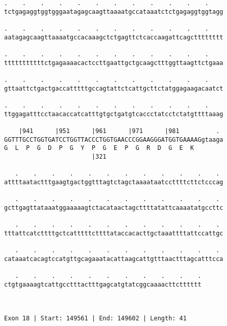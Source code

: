 \documentclass{article}
\begin{document}
\begin{Verbatim}
.    .    .    .    .    .    .    .    .    .    .    .    
tctgagaggtggtgggaatagagcaagttaaaatgccataaatctctgagaggtggtagg
                                                            
.    .    .    .    .    .    .    .    .    .    .    .    
aatagagcaagttaaaatgccacaaagctctgagttctcaccaagattcagctttttttt
                                                            
.    .    .    .    .    .    .    .    .    .    .    .    
tttttttttttctgagaaaacactccttgaattgctgcaagctttggttaagttctgaaa
                                                            
.    .    .    .    .    .    .    .    .    .    .    .    
gttaattctgactgaccatttttgccagtattctcattgcttctatggagaagacaatct
                                                            
.    .    .    .    .    .    .    .    .    .    .    .    
ttggagatttcctaacaccatcatttgtgctgatgtcaccctatcctctatgttttaaag
                                                            
    |941      |951      |961      |971      |981          . 
GGTTTGCCTGGTGATCCTGGTTACCCTGGTGAACCCGGAAGGGATGGTGAAAAGgtaaga
G  L  P  G  D  P  G  Y  P  G  E  P  G  R  D  G  E  K        
                        |321                                
  
   .    .    .    .    .    .    .    .    .    .    .    . 
attttaatactttgaagtgactggtttagtctagctaaaataatccttttcttctcccag
                                                            
   .    .    .    .    .    .    .    .    .    .    .    . 
gcttgagttataaatggaaaaagtctacataactagcttttatattcaaaatatgccttc
                                                            
   .    .    .    .    .    .    .    .    .    .    .    . 
tttattcatcttttgctcatttttcttttataccacacttgctaaattttattccattgc
                                                            
   .    .    .    .    .    .    .    .    .    .    .    . 
cataaatcacagtccatgttgcagaaatacattaagcattgtttaactttagcatttcca
                                                            
   .    .    .    .    .    .    .    .    .    .    .
ctgtgaaaagtcattgcctttactttgagcatgtatcggcaaaacttctttttt
                                                      
                                                      
 
Exon 18 | Start: 149561 | End: 149602 | Length: 41
 

\end{Verbatim}
\end{document}
